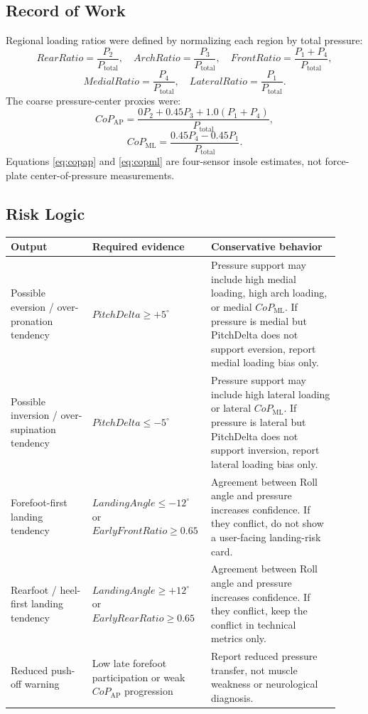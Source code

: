 \documentclass[11pt]{article}
\begin{document}
{
\subsection*{Record of Work}
Regional loading ratios were defined by normalizing each region by total pressure:
\begin{equation}
RearRatio = \frac{P_2}{P_{\mathrm{total}}},
\quad
ArchRatio = \frac{P_3}{P_{\mathrm{total}}},
\quad
FrontRatio = \frac{P_1+P_4}{P_{\mathrm{total}}},
\label{eq:regionalratios}
\end{equation}
\begin{equation}
MedialRatio = \frac{P_4}{P_{\mathrm{total}}},
\quad
LateralRatio = \frac{P_1}{P_{\mathrm{total}}}.
\label{eq:mlratios}
\end{equation}
The coarse pressure-center proxies were:
\begin{equation}
CoP_{\mathrm{AP}} =
\frac{0P_2+0.45P_3+1.0(P_1+P_4)}{P_{\mathrm{total}}},
\label{eq:copap}
\end{equation}
\begin{equation}
CoP_{\mathrm{ML}} =
\frac{0.45P_4-0.45P_1}{P_{\mathrm{total}}}.
\label{eq:copml}
\end{equation}
Equations \ref{eq:copap} and \ref{eq:copml} are four-sensor insole estimates, not force-plate center-of-pressure measurements.

\subsection*{Risk Logic}
\begin{longtable}{p{0.24\linewidth}p{0.30\linewidth}p{0.38\linewidth}}
\toprule
\textbf{Output} & \textbf{Required evidence} & \textbf{Conservative behavior} \\
\midrule
Possible eversion / over-pronation tendency &
$PitchDelta\ge +5^\circ$ &
Pressure support may include high medial loading, high arch loading, or medial $CoP_{\mathrm{ML}}$. If pressure is medial but PitchDelta does not support eversion, report medial loading bias only. \\
Possible inversion / over-supination tendency &
$PitchDelta\le -5^\circ$ &
Pressure support may include high lateral loading or lateral $CoP_{\mathrm{ML}}$. If pressure is lateral but PitchDelta does not support inversion, report lateral loading bias only. \\
Forefoot-first landing tendency &
$LandingAngle\le -12^\circ$ or $EarlyFrontRatio\ge 0.65$ &
Agreement between Roll angle and pressure increases confidence. If they conflict, do not show a user-facing landing-risk card. \\
Rearfoot / heel-first landing tendency &
$LandingAngle\ge +12^\circ$ or $EarlyRearRatio\ge 0.65$ &
Agreement between Roll angle and pressure increases confidence. If they conflict, keep the conflict in technical metrics only. \\
Reduced push-off warning &
Low late forefoot participation or weak $CoP_{\mathrm{AP}}$ progression &
Report reduced pressure transfer, not muscle weakness or neurological diagnosis. \\
\bottomrule
\end{longtable}

}
\end{document}
